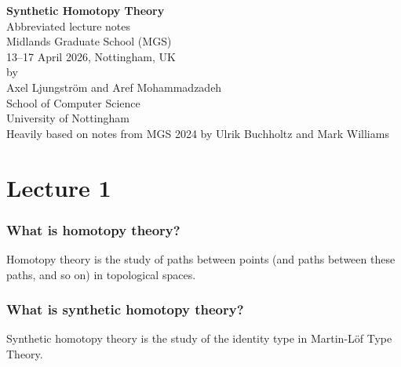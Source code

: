 \documentclass[10pt,oneside,leqno,openright]{memoir}
\begin{document}
\frontmatter
\thispagestyle{empty}
\begin{center}
  \LARGE
  {\bfseries Synthetic Homotopy Theory}\\[1cm]
  \large Abbreviated lecture notes\\[5mm]
  \Large Midlands Graduate School (MGS)\\
  \large 13--17 April 2026, Nottingham, UK\\[1cm]
  by\\
  Axel Ljungström and Aref Mohammadzadeh\\
  School of Computer Science\\
  University of Nottingham\\[1cm]
  Heavily based on notes from MGS 2024 by
  Ulrik Buchholtz and Mark Williams\\
\end{center}

\vfill


\clearpage


\mainmatter






\chapter*{Lecture 1}
\subsection*{What is homotopy theory?}
Homotopy theory is the study of paths between points (and paths between these paths, and so on) in topological spaces.
\subsection*{What is synthetic homotopy theory?}
Synthetic homotopy theory is the study of the identity type in Martin-Löf Type Theory.
\end{document}
